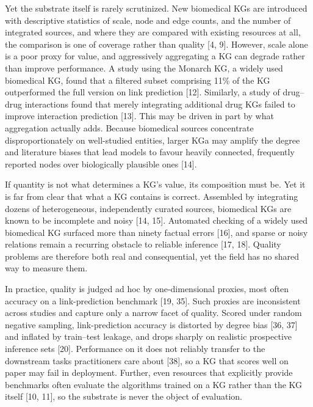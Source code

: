 Yet the substrate itself is rarely scrutinized. New biomedical KGs are introduced with descriptive statistics of scale, node and edge counts, and the number of integrated sources, and where they are compared with existing resources at all, the comparison is one of coverage rather than quality {[}4, 9{]}. However, scale alone is a poor proxy for value, and aggressively aggregating a KG can degrade rather than improve performance. A study using the Monarch KG, a widely used biomedical KG, found that a filtered subset comprising 11\% of the KG outperformed the full version on link prediction {[}12{]}. Similarly, a study of drug--drug interactions found that merely integrating additional drug KGs failed to improve interaction prediction {[}13{]}. This may be driven in part by what aggregation actually adds. Because biomedical sources concentrate disproportionately on well-studied entities, larger KGa may amplify the degree and literature biases that lead models to favour heavily connected, frequently reported nodes over biologically plausible ones {[}14{]}.

If quantity is not what determines a KG's value, its composition must be. Yet it is far from clear that what a KG contains is correct. Assembled by integrating dozens of heterogeneous, independently curated sources, biomedical KGs are known to be incomplete and noisy {[}14, 15{]}. Automated checking of a widely used biomedical KG surfaced more than ninety factual errors {[}16{]}, and sparse or noisy relations remain a recurring obstacle to reliable inference {[}17, 18{]}. Quality problems are therefore both real and consequential, yet the field has no shared way to measure them.

In practice, quality is judged ad hoc by one-dimensional proxies, most often accuracy on a link-prediction benchmark {[}19, 35{]}. Such proxies are inconsistent across studies and capture only a narrow facet of quality. Scored under random negative sampling, link-prediction accuracy is distorted by degree bias {[}36, 37{]} and inflated by train--test leakage, and drops sharply on realistic prospective inference sets {[}20{]}. Performance on it does not reliably transfer to the downstream tasks practitioners care about {[}38{]}, so a KG that scores well on paper may fail in deployment. Further, even resources that explicitly provide benchmarks often evaluate the algorithms trained on a KG rather than the KG itself {[}10, 11{]}, so the substrate is never the object of evaluation.


